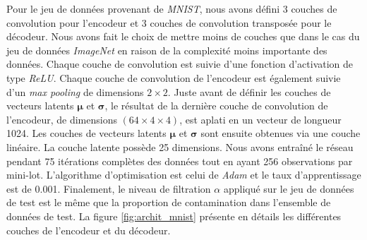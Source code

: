 Pour le jeu de données provenant de \textit{MNIST}, nous avons défini 3 couches de convolution pour l'encodeur et 3 couches de convolution transposée pour le décodeur. Nous avons fait le choix de mettre moins de couches que dans le cas du jeu de données \textit{ImageNet} en raison de la complexité moins importante des données.  Chaque couche de convolution est suivie d'une fonction d'activation de type \textit{ReLU}. Chaque couche de convolution de l'encodeur est également suivie d'un \textit{max pooling} de dimensions $2 \times 2$. Juste avant de définir les couches de vecteurs latents $\boldsymbol{\mu}$ et $\boldsymbol{\sigma}$, le résultat de la dernière couche de convolution de l'encodeur, de dimensions $(64 \times 4 \times 4)$, est aplati en un vecteur  de longueur 1024. Les couches de vecteurs latents $\boldsymbol{\mu}$ et $\boldsymbol{\sigma}$ sont ensuite obtenues via une couche linéaire. La couche latente possède 25 dimensions. Nous avons entraîné le réseau pendant 75 itérations complètes des données tout en ayant 256 observations par mini-lot. L'algorithme d'optimisation est celui de \textit{Adam} et le taux d'apprentissage est de 0.001. Finalement, le niveau de filtration $\alpha$ appliqué sur le jeu de données de test est le même que la proportion de contamination dans l'ensemble de données de test. La figure \ref{fig:archit_mnist} présente en détails les différentes couches de l'encodeur et du décodeur.

